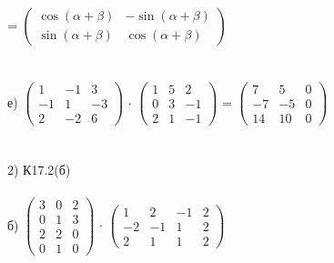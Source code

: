 \documentclass[12pt, a4paper]{article}
\begin{document}
	\\
	\\
	\\
	=
	\begin{math}
		\left(
		\begin{array}{rr}
			\cos(\alpha + \beta)& -\sin(\alpha+\beta)\\
			\sin(\alpha + \beta) & \cos(\alpha + \beta)
		\end{array}
		\right )
	\end{math}
	\\
	\\
	\\
	е)
	\begin{math}
		\left(
		\begin{array}{rrr}
			1& -1 & 3\\
			-1& 1 & -3\\
			2& -2 & 6
		\end{array}
		\right )
	\end{math}
	$\cdot$
	\begin{math}
		\left(
		\begin{array}{rrr}
			1& 5 & 2\\
			0& 3 & -1\\
			2& 1 & -1
		\end{array}
		\right )
	\end{math}
	= 
	\begin{math}
		\left(
		\begin{array}{rrr}
			7& 5 & 0\\
			-7& -5 & 0\\
			14& 10 & 0
		\end{array}
		\right )
	\end{math}
	\\
	\\
	\\
	2) К17.2(б)\\
	\\
	б)
	\begin{math}
		\left(
		\begin{array}{rrr}
			3& 0 & 2\\
			0& 1 & 3\\
			2& 2 & 0\\
			0 & 1 & 0
		\end{array}
		\right )
	\end{math}
	$\cdot$
	\begin{math}
		\left(
		\begin{array}{rrrr}
			1& 2 & -1 & 2\\
			-2& -1 & 1 & 2\\
			2& 1 & 1 & 2
		\end{array}
		\right )
	\end{math}
\end{document}

